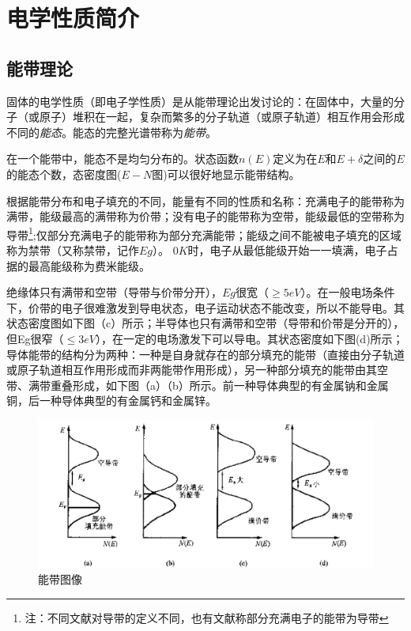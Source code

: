 
\chapter{电学性质简介}

\section{能带理论}

固体的电学性质（即电子学性质）是从能带理论出发讨论的：在固体中，大量的分子（或原子）堆积在一起，复杂而繁多的分子轨道（或原子轨道）相互作用会形成不同的\textit{能态}。能态的完整光谱带称为\textit{能带}。

在一个能带中，能态不是均匀分布的。状态函数$n(E)$定义为在$E$和$E+\delta$之间的$E$的能态个数，态密度图($E-N$图)可以很好地显示能带结构。

根据能带分布和电子填充的不同，能量有不同的性质和名称：充满电子的能带称为满带，能级最高的满带称为价带；没有电子的能带称为空带，能级最低的空带称为导带\footnote{注：不同文献对导带的定义不同，也有文献称部分充满电子的能带为导带};仅部分充满电子的能带称为部分充满能带；能级之间不能被电子填充的区域称为禁带（又称禁带，记作$Eg$）。 $0K$时，电子从最低能级开始一一填满，电子占据的最高能级称为费米能级。

绝缘体只有满带和空带（导带与价带分开），$Eg$很宽（$\geq 5eV$）。在一般电场条件下，价带的电子很难激发到导电状态，电子运动状态不能改变，所以不能导电。其状态密度图如下图（c）所示；半导体也只有满带和空带（导带和价带是分开的），但Eg很窄（$\leq 3eV$），在一定的电场激发下可以导电。其状态密度如下图(d)所示；导体能带的结构分为两种：一种是自身就存在的部分填充的能带（直接由分子轨道或原子轨道相互作用形成而非两能带作用形成），另一种部分填充的能带由其空带、满带重叠形成，如下图（a）（b）所示。前一种导体典型的有金属钠和金属铜，后一种导体典型的有金属钙和金属锌。

\begin{figure}
    \centering
    \includegraphics[scale=0.3]{img/能带.png}
    \caption{能带图像}
\end{figure}

